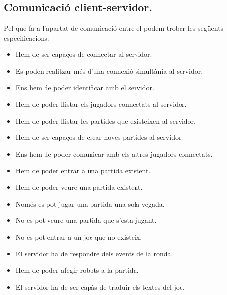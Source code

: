 \subsection{Comunicació client-servidor.}

Pel que fa a l'apartat de comunicació entre el  podem trobar les següents especificacions:

\begin{itemize}   
    \item{Hem de ser capaços de connectar al servidor.}
    \item{Es poden realitzar més d'una connexió simultània al servidor.}
    \item{Ens hem de poder identificar amb el servidor.}
    \item{Hem de poder llistar els jugadors connectats al servidor.}
    \item{Hem de poder llistar les partides que existeixen al servidor.} 
    \item{Hem de ser capaços de crear noves partides al servidor.}
    \item{Ens hem de poder comunicar amb els altres jugadors connectats.}
    \item{Hem de poder entrar a una partida existent.}
    \item{Hem de poder veure una partida existent.}
    \item{Només es pot jugar una partida una sola vegada.}
    \item{No es pot veure una partida que s'esta jugant.}
    \item{No es pot entrar a un joc que no existeix.}
    \item{El servidor ha de respondre dels events de la ronda.}
    \item{Hem de poder afegir robots a la partida.}
    \item{El servidor ha de ser capàs de traduir els textes del joc.}
\end{itemize}

